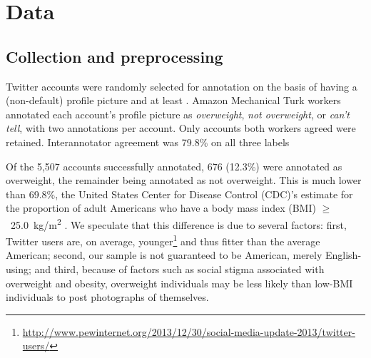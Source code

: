 \section{Data}

\subsection{Collection and preprocessing}

Twitter accounts were randomly selected for annotation on the basis of having a (non-default) profile picture and at least . %
Amazon Mechanical Turk workers annotated each account's profile picture as \textit{overweight}, \textit{not overweight}, or \textit{can't tell}, with two annotations per account. Only accounts  both workers agreed  were retained. Interannotator agreement was 79.8\%  on all three labels


Of the 5,507 accounts successfully annotated, 676 (12.3\%) were annotated as overweight, the remainder being annotated as not overweight. This is much lower than 69.8\%, the United States Center for Disease Control (CDC)'s estimate for the proportion of adult Americans who have a body mass index (BMI) %
$\geq$~25.0~kg/m\textsuperscript{2} \cite{nhanes2013}. We speculate that this difference is due to several factors: first, Twitter users are, on average, younger\footnote{\url{http://www.pewinternet.org/2013/12/30/social-media-update-2013/twitter-users/}} and thus fitter than the average American; second, our sample is not guaranteed to be American, merely English-using; and third, because of factors such as social stigma associated with overweight and obesity, overweight individuals may be less likely than low-BMI individuals to post photographs of themselves. %

